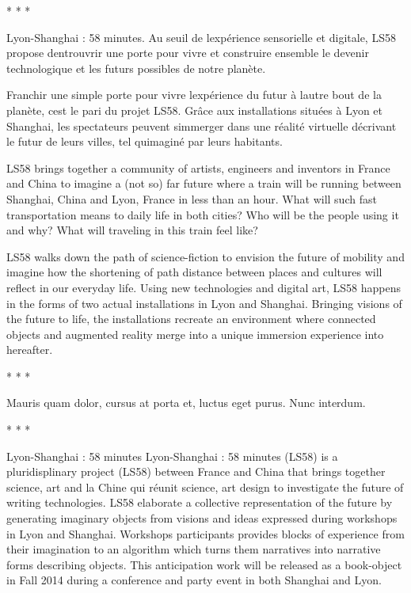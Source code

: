 {\centering
* * *
\par}

Lyon-Shanghai : 58 minutes. Au seuil de l{\textquotesingle}exp\'erience
sensorielle et digitale, LS58 propose d{\textquotesingle}entrouvrir une
porte pour vivre et construire ensemble le devenir technologique et les
futurs possibles de notre plan\`ete.

Franchir une simple porte pour vivre l{\textquotesingle}exp\'erience du
futur \`a l{\textquotesingle}autre bout de la plan\`ete,
c{\textquotesingle}est le pari du projet LS58. Gr\^ace aux
installations situ\'ees \`a Lyon et Shanghai, les spectateurs peuvent
s{\textquotesingle}immerger dans une r\'ealit\'e virtuelle d\'ecrivant
le futur de leurs villes, tel qu{\textquotesingle}imagin\'e par leurs
habitants.

LS58 brings together a community of artists, engineers and inventors in
France and China to\newline
imagine a (not so) far future where a train will be running between
Shanghai, China and Lyon,\newline
France in less than an hour. What will such fast transportation means to
daily life in both cities?\newline
Who will be the people using it and why? What will traveling in this
train feel like?

LS58 walks down the path of science-fiction to envision the future of
mobility and imagine how the shortening of path distance between places
and cultures will reflect in our everyday life.\newline
Using new technologies and digital art, LS58 happens in the forms of two
actual installations in\newline
Lyon and Shanghai. Bringing visions of the future to life, the
installations recreate an\newline
environment where connected objects and augmented reality merge into a
unique immersion\newline
experience into hereafter.

{\centering
* * *
\par}

{\centering
Mauris quam dolor, cursus at porta et, luctus eget purus. Nunc interdum.
\par}

{\centering
* * *
\par}

Lyon-Shanghai : 58 minutes Lyon-Shanghai : 58 minutes (LS58) is a
pluridisplinary project (LS58) between France and China that brings
together science, art and la Chine qui r\'eunit science, art design to
investigate the future of writing technologies.\newline
LS58 elaborate a collective representation of the future by generating
imaginary objects from visions and ideas expressed during workshops in
Lyon and Shanghai. Workshops participants provides blocks of experience
from their imagination to an algorithm which turns them narratives into
narrative forms describing objects. This anticipation work will be
released as a book-object in Fall 2014 during a conference and party
event in both Shanghai and Lyon.

